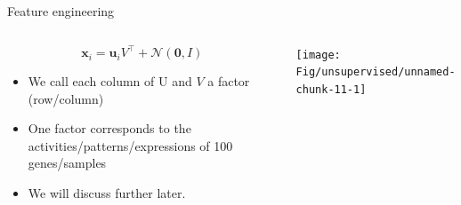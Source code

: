 \documentclass[
  ignorenonframetext,
  aspectratio=169]{beamer}
\begin{document}
\begin{frame}{Feature engineering}
\protect\hypertarget{feature-engineering-1}{}
\begin{columns}[T]
\begin{column}{.5\textwidth}
\[\mathbf{x}_{i} = \mathbf{u}_{i} V^{\top} + \mathcal{N}\!\left(\mathbf{0},I\right)\]

\begin{itemize}
\item
  We call each column of U and \(V\) a factor (row/column)
\item
  One factor corresponds to the activities/patterns/expressions of 100
  genes/samples
\item
  We will discuss further later.
\end{itemize}
\end{column}

\begin{column}{.5\textwidth}
\scriptsize

\begin{center}\texttt{[image: Fig/unsupervised/unnamed-chunk-11-1]} \end{center}

\normalsize
\end{column}
\end{columns}
\end{frame}
\end{document}

